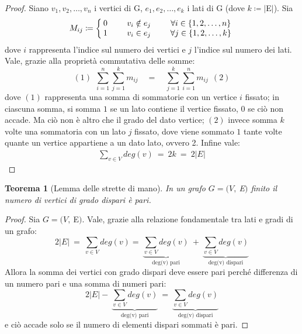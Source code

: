 \documentclass[12pt]{article}
\newcommand{\Eps}{$E\:$}
\newcommand{\MathEps}{E}
\newcommand{\grafo}{(V, \: \Eps)}
\newtheorem{theorem}{Teorema}
\begin{document}
\begin{proof}
	Siano $v_1, v_2,\ldots ,v_n$ i vertici di G, $e_1, e_2,\ldots, e_k$ i lati di G (dove $k \coloneqq | \Eps |$). Sia
	\[
		M_{ij} \coloneqq \left\{
		\setlength\arraycolsep{2pt}
		\begin{array}{ccc} 0 & \qquad v_i \notin e_j & \qquad \forall i \in \{1, 2, \ldots , n\} \\ \relax
			1       & \qquad v_i \in e_j    & \qquad \forall j \in \{1, 2, \ldots ,k \}
		\end{array}\right
		.
	\]
	dove $i$ rappresenta l'indice sul numero dei vertici e $j$ l'indice sul numero dei lati. Vale, grazie alla proprietà commutativa delle somme:
	$$ (1)\ \ \sum_{i=1}^n \sum_{j=1}^k m_{ij} \quad = \quad \sum_{j=1}^k\sum_{i=1}^n m_{ij}\ \ (2)$$
	dove $(1)$ rappresenta una somma di sommatorie con un vertice $i$ fissato; in ciascuna somma, si somma $1$ se un lato contiene il vertice fissato, $0$ se ciò non accade. Ma ciò non è altro che il grado del dato vertice; $(2)$ invece somma $k$ volte una sommatoria con un lato $j$ fissato, dove viene sommato $1$ tante volte quante un vertice appartiene a un dato lato, ovvero 2. Infine vale:
	\begin{align*}
		\sum_{v\in V} deg(v) \ = \ 2k \ =\ 2 |\MathEps |
	\end{align*}
\end{proof}

\begin{theorem}[Lemma delle strette di mano]
	In un grafo $G = \grafo$ finito il numero di vertici di grado dispari è pari.
\end{theorem}

\begin{proof}
	Sia $G = \grafo$. Vale, grazie alla relazione fondamentale tra lati e gradi di un grafo:
	\[
		2 | \MathEps | \ =\ \sum_{v\in V} deg (v)
		= \ \underbrace{\sum_{v\in V} deg (v)}_{\text{deg(v) pari}} \ + \ \underbrace{\sum_{v\in V} deg (v)}_{\text{deg(v) dispari}}
	\]
	Allora la somma dei vertici con grado dispari deve essere pari perché differenza di un numero pari e una somma di numeri pari:
	\[
		2 | \MathEps | - \ \underbrace{\sum_{v\in V} deg (v)}_{\text{deg(v) pari}} \ = \ \underbrace{\sum_{v\in V} deg (v)}_{\text{deg(v) dispari}}
	\]
	e ciò accade solo se il numero di elementi dispari sommati è pari.
\end{proof}
\end{document}
